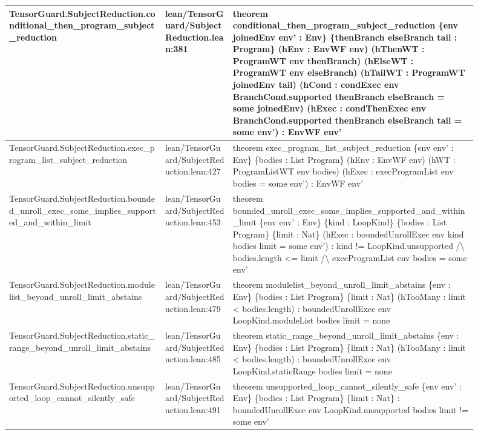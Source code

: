 \documentclass[10pt]{article}
\begin{document}
\begin{longtable}{|p{0.30\linewidth}|p{0.13\linewidth}|p{0.47\linewidth}|}
\hline
TensorGuard.SubjectReduction.conditional\_then\_program\_subject\_reduction & lean/TensorGuard/SubjectReduction.lean:381 & theorem conditional\_then\_program\_subject\_reduction \{env joinedEnv env' : Env\} \{thenBranch elseBranch tail : Program\} (hEnv : EnvWF env) (hThenWT : ProgramWT env thenBranch) (hElseWT : ProgramWT env elseBranch) (hTailWT : ProgramWT joinedEnv tail) (hCond : condExec env BranchCond.supported thenBranch elseBranch = some joinedEnv) (hExec : condThenExec env BranchCond.supported thenBranch elseBranch tail = some env') : EnvWF env' \\
\hline
TensorGuard.SubjectReduction.exec\_program\_list\_subject\_reduction & lean/TensorGuard/SubjectReduction.lean:427 & theorem exec\_program\_list\_subject\_reduction \{env env' : Env\} \{bodies : List Program\} (hEnv : EnvWF env) (hWT : ProgramListWT env bodies) (hExec : execProgramList env bodies = some env') : EnvWF env' \\
\hline
TensorGuard.SubjectReduction.bounded\_unroll\_exec\_some\_implies\_supported\_and\_within\_limit & lean/TensorGuard/SubjectReduction.lean:453 & theorem bounded\_unroll\_exec\_some\_implies\_supported\_and\_within\_limit \{env env' : Env\} \{kind : LoopKind\} \{bodies : List Program\} \{limit : Nat\} (hExec : boundedUnrollExec env kind bodies limit = some env') : kind != LoopKind.unsupported /\textbackslash{} bodies.length <= limit /\textbackslash{} execProgramList env bodies = some env' \\
\hline
TensorGuard.SubjectReduction.modulelist\_beyond\_unroll\_limit\_abstains & lean/TensorGuard/SubjectReduction.lean:479 & theorem modulelist\_beyond\_unroll\_limit\_abstains \{env : Env\} \{bodies : List Program\} \{limit : Nat\} (hTooMany : limit < bodies.length) : boundedUnrollExec env LoopKind.moduleList bodies limit = none \\
\hline
TensorGuard.SubjectReduction.static\_range\_beyond\_unroll\_limit\_abstains & lean/TensorGuard/SubjectReduction.lean:485 & theorem static\_range\_beyond\_unroll\_limit\_abstains \{env : Env\} \{bodies : List Program\} \{limit : Nat\} (hTooMany : limit < bodies.length) : boundedUnrollExec env LoopKind.staticRange bodies limit = none \\
\hline
TensorGuard.SubjectReduction.unsupported\_loop\_cannot\_silently\_safe & lean/TensorGuard/SubjectReduction.lean:491 & theorem unsupported\_loop\_cannot\_silently\_safe \{env env' : Env\} \{bodies : List Program\} \{limit : Nat\} : boundedUnrollExec env LoopKind.unsupported bodies limit != some env' \\

\end{longtable}
\end{document}
